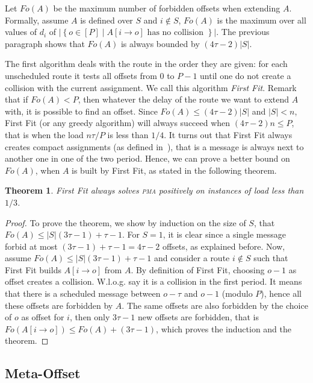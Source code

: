\documentclass[10pt, conference, letterpaper]{IEEEtran}
\newtheorem{theorem}{Theorem}
\newcommand\pma{\textsc{pma}\xspace}
\begin{document}
Let $Fo(A)$ be the maximum number of forbidden offsets when extending $A$. Formally, assume $A$ is defined over $S$ and $i\notin S$, $Fo(A)$ is the maximum over all values of $d_i$ of $|\left\{ o \in [P] \mid A[i \rightarrow o] \text{ has no collision }\right\}|$. The previous paragraph shows that $Fo(A)$ is always bounded by $(4 \tau -2)|S|$. 

The first algorithm deals with the route in the order they are given:  for each unscheduled route it tests all offsets from $0$ to $P-1$ until one do not create a collision with the current assignment.
We call this algorithm \emph{First Fit}. Remark that if $Fo(A) < P$, then whatever the delay of the route we want to extend $A$ with, it is possible to find an offset. Since $Fo(A) \leq (4 \tau -2)|S|$ and $|S| < n$, First Fit (or any greedy algorithm) will always succeed when $(4 \tau -2)n \leq P$, that is when the load $ n\tau /P$ is less than $1/4$.
It turns out that First Fit always creates compact assignments (as defined in~\cite{dominique2018deterministic}), that is a message is always next to another one in one of the two period. Hence, we can prove a better bound on $Fo(A)$, when $A$ is built by First Fit, as stated in the following theorem.

\begin{theorem}
First Fit always solves \pma positively on instances of load less than $1/3$. 
\end{theorem}
\begin{proof}
To prove the theorem, we show by induction on the size of $S$, that $Fo(A) \leq |S|(3\tau -1) + \tau -1$.  For $S = 1$, it is clear since a single message forbid at most $(3\tau -1) + \tau -1 = 4\tau-2$ offsets, as explained before. Now, assume $Fo(A) \leq |S|(3\tau -1) + \tau -1$ and consider a route $i \notin S$ such that First Fit builds $A[i \rightarrow o]$ from $A$. By definition of First Fit, choosing $o-1$ as offset creates a collision. W.l.o.g. say it is a collision in the first period. It means that there is a scheduled message between $o - \tau $ and $o-1$ (modulo $P$), hence all these offsets are forbidden by $A$. The same offsets are also forbidden by the choice of $o$ as offset for $i$, then only $3\tau -1$ new offsets are forbidden, that is $Fo(A[i \rightarrow o]) \leq Fo(A) + (3\tau -1)$, which proves the induction and the theorem.
\end{proof}


\subsection{Meta-Offset}
\end{document}
